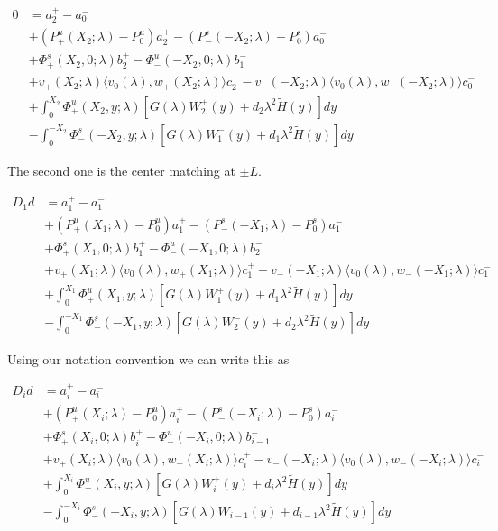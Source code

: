 \documentclass[12pt]{article}
\begin{document}
\begin{enumerate}
\begin{align*}
0 &= a_2^+ - a_0^- \\
&+ (P^u_+(X_2; \lambda) - P_0^u)a_2^+ - (P^s_-(-X_2; \lambda) - P_0^s)a_0^- \\
&+ \Phi^s_+(X_2, 0; \lambda)b_2^+ - \Phi^u_-(-X_2, 0; \lambda)b_1^- \\
&+ v_+(X_2; \lambda) \langle v_0(\lambda), w_+(X_2; \lambda) \rangle c_2^+ - v_-(-X_2; \lambda) \langle v_0(\lambda), w_-(-X_2; \lambda) \rangle c_0^- \\
&+ \int_0^{X_2} \Phi^u_+(X_2, y; \lambda) [ G(\lambda)W_2^+(y) + d_2 \lambda^2 \tilde{H}(y) ] dy \\
&- \int_0^{-X_2} \Phi^s_-(-X_2, y; \lambda) [ G(\lambda)W_1^-(y) + d_1 \lambda^2 \tilde{H}(y) ] dy
\end{align*}

The second one is the center matching at $\pm L$.

\begin{align*}
D_1 d &= a_1^+ - a_1^- \\
&+ (P^u_+(X_1; \lambda) - P_0^u)a_1^+ - (P^s_-(-X_1; \lambda) - P_0^s)a_1^- \\
&+ \Phi^s_+(X_1, 0; \lambda)b_1^+ - \Phi^u_-(-X_1, 0; \lambda)b_2^- \\
&+ v_+(X_1; \lambda) \langle v_0(\lambda), w_+(X_1; \lambda) \rangle c_1^+ - v_-(-X_1; \lambda) \langle v_0(\lambda), w_-(-X_1; \lambda) \rangle c_1^- \\
&+ \int_0^{X_1} \Phi^u_+(X_1, y; \lambda) [ G(\lambda)W_1^+(y) + d_1 \lambda^2 \tilde{H}(y) ] dy \\
&- \int_0^{-X_1} \Phi^s_-(-X_1, y; \lambda) [ G(\lambda)W_2^-(y) + d_2 \lambda^2 \tilde{H}(y) ] dy
\end{align*}

Using our notation convention we can write this as


\begin{align*}
D_i d &= a_i^+ - a_i^- \\
&+ (P^u_+(X_i; \lambda) - P_0^u)a_i^+ - (P^s_-(-X_i; \lambda) - P_0^s)a_i^- \\
&+ \Phi^s_+(X_i, 0; \lambda)b_i^+ - \Phi^u_-(-X_i, 0; \lambda)b_{i-1}^- \\
&+ v_+(X_i; \lambda) \langle v_0(\lambda), w_+(X_i; \lambda) \rangle c_i^+ - v_-(-X_i; \lambda) \langle v_0(\lambda), w_-(-X_i; \lambda) \rangle c_i^- \\
&+ \int_0^{X_i} \Phi^u_+(X_i, y; \lambda) [ G(\lambda)W_i^+(y) + d_i \lambda^2 \tilde{H}(y) ] dy \\
&- \int_0^{-X_i} \Phi^s_-(-X_i, y; \lambda) [ G(\lambda)W_{i-1}^-(y) + d_{i-1} \lambda^2 \tilde{H}(y) ] dy
\end{align*}


\end{enumerate}
\end{document}

